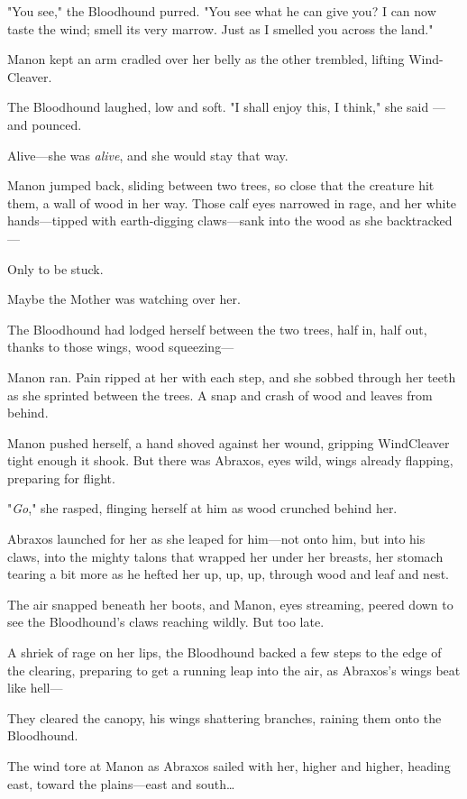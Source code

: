 "You see," the Bloodhound purred. "You see what he can give you? I can now taste the wind; smell its very marrow. Just as I smelled you across the land."

Manon kept an arm cradled over her belly as the other trembled, lifting Wind-Cleaver.

The Bloodhound laughed, low and soft. "I shall enjoy this, I think," she said ---and pounced.

Alive---she was \emph{alive}, and she would stay that way.

Manon jumped back, sliding between two trees, so close that the creature hit them, a wall of wood in her way. Those calf eyes narrowed in rage, and her white hands---tipped with earth-digging claws---sank into the wood as she backtracked---

Only to be stuck.

Maybe the Mother was watching over her.

The Bloodhound had lodged herself between the two trees, half in, half out, thanks to those wings, wood squeezing---

Manon ran. Pain ripped at her with each step, and she sobbed through her teeth as she sprinted between the trees. A snap and crash of wood and leaves from behind.

Manon pushed herself, a hand shoved against her wound, gripping WindCleaver tight enough it shook. But there was Abraxos, eyes wild, wings already flapping, preparing for flight.

"\emph{Go}," she rasped, flinging herself at him as wood crunched behind her.

Abraxos launched for her as she leaped for him---not onto him, but into his claws, into the mighty talons that wrapped her under her breasts, her stomach tearing a bit more as he hefted her up, up, up, through wood and leaf and nest.

The air snapped beneath her boots, and Manon, eyes streaming, peered down to see the Bloodhound's claws reaching wildly. But too late.

A shriek of rage on her lips, the Bloodhound backed a few steps to the edge of the clearing, preparing to get a running leap into the air, as Abraxos's wings beat like hell---

They cleared the canopy, his wings shattering branches, raining them onto the Bloodhound.

The wind tore at Manon as Abraxos sailed with her, higher and higher, heading east, toward the plains---east and south\ldots{}

